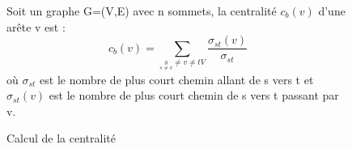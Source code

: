 \begin{figure}[H]
   \centering
   \frame
   {
      \parbox{12cm}
      {
         Soit un graphe G=(V,E) avec n sommets, la centralité $c_b(v)$ d'une arête v est :
         \begin{equation}
               c_b(v) = \sum_{\underset{s \neq v}s \neq v \neq t V} \frac{\sigma_{st}(v)}{\sigma_{st}}
         \end{equation}
	o\`u $\sigma_{st}$ est le nombre de plus court chemin allant de s vers t et $\sigma_{st}(v)$ est le nombre de plus court chemin de s vers t passant par v.
      }
   }
  \caption{\label{centralit\'e}Calcul de la centralit\'e}
\end{figure}



%
